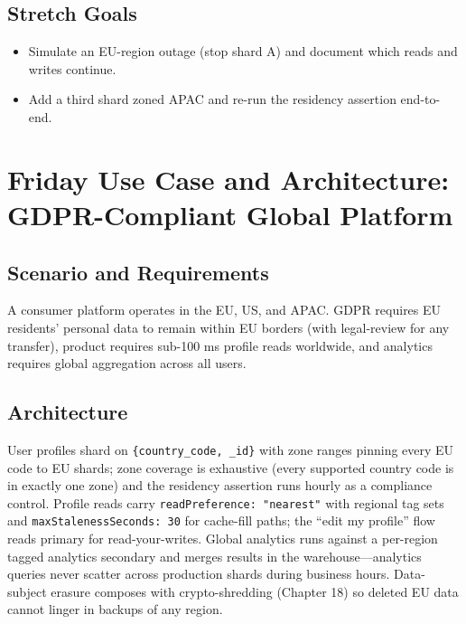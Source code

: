 \subsection*{Stretch Goals}
\begin{itemize}
    \item Simulate an EU-region outage (stop shard A) and document which reads and writes continue.
    \item Add a third shard zoned APAC and re-run the residency assertion end-to-end.
\end{itemize}

\section{Friday Use Case and Architecture: GDPR-Compliant Global Platform}
\subsection{Scenario and Requirements}
A consumer platform operates in the EU, US, and APAC. GDPR requires EU residents' personal data to remain within EU borders (with legal-review for any transfer), product requires sub-100 ms profile reads worldwide, and analytics requires global aggregation across all users.

\subsection{Architecture}
User profiles shard on \texttt{\{country\_code, \_id\}} with zone ranges pinning every EU code to EU shards; zone coverage is exhaustive (every supported country code is in exactly one zone) and the residency assertion runs hourly as a compliance control. Profile reads carry \texttt{readPreference: "nearest"} with regional tag sets and \texttt{maxStalenessSeconds: 30} for cache-fill paths; the ``edit my profile'' flow reads primary for read-your-writes. Global analytics runs against a per-region tagged analytics secondary and merges results in the warehouse---analytics queries never scatter across production shards during business hours. Data-subject erasure composes with crypto-shredding (Chapter 18) so deleted EU data cannot linger in backups of any region.

